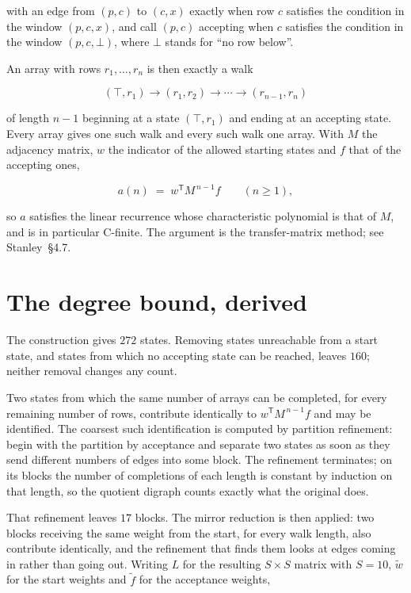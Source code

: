 \documentclass[11pt]{article}
\theoremstyle{definition}
\begin{document}
with an edge from $(p,c)$ to $(c,x)$ exactly when row $c$ satisfies the condition in the window $(p,c,x)$, and call $(p,c)$ accepting when $c$ satisfies the condition in the window $(p,c,\bot)$, where $\bot$ stands for ``no row below''.

An array with rows $r_1,\dots,r_n$ is then exactly a walk

\[(\top,r_1) \to (r_1,r_2) \to \cdots \to (r_{n-1},r_n)\]

of length $n-1$ beginning at a state $(\top,r_1)$ and ending at an accepting state. Every array gives one such walk and every such walk one array. With $M$ the adjacency matrix, $w$ the indicator of the allowed starting states and $f$ that of the accepting ones,

\[a(n) \;=\; w^{\mathsf T} M^{\,n-1} f \qquad (n \ge 1),\]

so $a$ satisfies the linear recurrence whose characteristic polynomial is that of $M$, and is in particular C-finite. The argument is the transfer-matrix method; see Stanley~\S4.7.

\section{The degree bound, derived}

The construction gives $272$ states. Removing states unreachable from a start state, and states from which no accepting state can be reached, leaves $160$; neither removal changes any count.

Two states from which the same number of arrays can be completed, for every remaining number of rows, contribute identically to $w^{\mathsf T}M^{\,n-1}f$ and may be identified. The coarsest such identification is computed by partition refinement: begin with the partition by acceptance and separate two states as soon as they send different numbers of edges into some block. The refinement terminates; on its blocks the number of completions of each length is constant by induction on that length, so the quotient digraph counts exactly what the original does.

That refinement leaves $17$ blocks. The mirror reduction is then applied: two blocks receiving the same weight from the start, for every walk length, also contribute identically, and the refinement that finds them looks at edges coming in rather than going out. Writing $L$ for the resulting $S \times S$ matrix with $S = 10$, $\tilde w$ for the start weights and $\tilde f$ for the acceptance weights,
\end{document}
